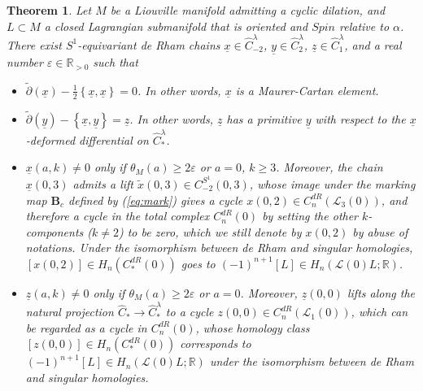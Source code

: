 \documentclass[a4paper]{article}
\newtheorem{theorem}{Theorem}
\numberwithin{equation}{section}
\begin{document}
\begin{theorem}\label{theorem:chain}
Let $M$ be a Liouville manifold admitting a cyclic dilation, and $L\subset M$ a closed Lagrangian submanifold that is oriented and $\mathit{Spin}$ relative to $\alpha$. There exist $S^1$-equivariant de Rham chains $\underline{x}\in\widehat{C}_{-2}^\lambda$, $\underline{y}\in\widehat{C}_2^\lambda$, $\underline{z}\in\widehat{C}_1^\lambda$, and a real number $\varepsilon\in\mathbb{R}_{>0}$ such that
\begin{itemize}
	\item[(i)] $\tilde{\partial}(\underline{x})-\frac{1}{2}\left\{\underline{x},\underline{x}\right\}=0$. In other words, $\underline{x}$ is a Maurer-Cartan element.
	\item[(ii)] $\tilde{\partial}(\underline{y})-\left\{\underline{x},\underline{y}\right\}=\underline{z}$. In other words, $\underline{z}$ has a primitive $\underline{y}$ with respect to the $\underline{x}$-deformed differential on $\widehat{C}_\ast^\lambda$.
	\item[(iii)] $\underline{x}(a,k)\neq 0$ only if $\theta_M(a)\geq2\varepsilon$ or $a=0$, $k\geq3$. Moreover, the chain $\underline{x}(0,3)$ admits a lift $\tilde{x}(0,3)\in C_{-2}^{S^1}(0,3)$, whose image under the marking map $\mathbf{B}_c$ defined by (\ref{eq:mark}) gives a cycle $x(0,2)\in C_n^\mathit{dR}(\mathcal{L}_3(0))$, and therefore a cycle in the total complex $C_n^\mathit{dR}(0)$ by setting the other $k$-components ($k\neq2$) to be zero, which we still denote by $x(0,2)$ by abuse of notations. Under the isomorphism between de Rham and singular homologies, $\left[x(0,2)\right]\in H_n\left(C_\ast^\mathit{dR}(0)\right)$ goes to $(-1)^{n+1}[L]\in H_n(\mathcal{L}(0)L;\mathbb{R})$.
	\item[(iv)] $\underline{z}(a,k)\neq0$ only if $\theta_M(a)\geq2\varepsilon$ or $a=0$. Moreover, $\underline{z}(0,0)$ lifts along the natural projection $\widehat{C}_\ast\rightarrow\widehat{C}_\ast^\lambda$ to a cycle $z(0,0)\in C_n^\mathit{dR}(\mathcal{L}_1(0))$, which can be regarded as a cycle in $C_n^\mathit{dR}(0)$, whose homology class $[z(0,0)]\in H_n\left(C_\ast^\mathit{dR}(0)\right)$ corresponds to $(-1)^{n+1}[L]\in H_n(\mathcal{L}(0)L;\mathbb{R})$ under the isomorphism between de Rham and singular homologies.
\end{itemize}
\end{theorem}
\end{document}
